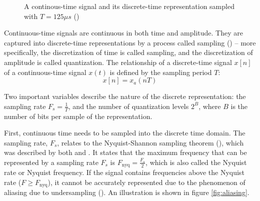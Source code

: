 \documentclass[report.tex]{subfiles}
\begin{document}
\begin{figure}[ht]
	\centering
	\hspace{0.1em}
	\caption{A continous-time signal and its discrete-time representation sampled with $T = 125\mu s$ (\cite[Chapter~2]{discretebook})}
	\label{fig:discretecontinuous}
\end{figure}

Continuous-time signals are continuous in both time and amplitude. They are captured into discrete-time representations by a process called sampling (\cite[Chapter~2]{melbook}) -- more specifically, the discretization of time is called sampling, and the discretization of amplitude is called quantization. The relationship of a discrete-time signal $x[n]$ of a continuous-time signal $x(t)$ is defined by the sampling period $T$:
\[ x[n] = x_{a}(nT) \]

Two important variables describe the nature of the discrete representation: the sampling rate $F_{s} = \frac{1}{T}$, and the number of quantization levels $2^{B}$, where $B$ is the number of bits per sample of the representation.

First, continuous time needs to be sampled into the discrete time domain. The sampling rate, $F_{s}$, relates to the Nyquist-Shannon sampling theorem (\cite[Chapter~4]{discretebook}), which was described by both \textcite{nyquist1928} and \textcite{shannon1948}. It states that the maximum frequency that can be represented by a sampling rate $F_{s}$ is $F_{\text{nyq}} = \frac{F_{s}}{2}$, which is also called the Nyquist rate or Nyquist frequency. If the signal contains frequencies above the Nyquist rate ($F \ge F_{\text{nyq}}$), it cannot be accurately represented due to the phenomenon of aliasing due to undersampling (\cite[Chapter~4]{discretebook}). An illustration is shown in figure \ref{fig:aliasing}.
\end{document}
